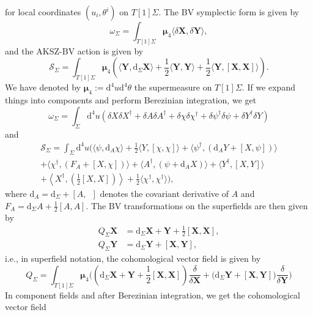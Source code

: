 \documentclass[11pt,colorinlistoftodos]{amsart}
\numberwithin{equation}{subsection}
\theoremstyle{plain}
\theoremstyle{definition}
\theoremstyle{remark}
\newcommand{\dd}{{\mathrm{d}}}
\newcommand{\calS}{\mathcal{S}}
\begin{document}
for local coordinates $(u_i,\theta^i)$ on $T[1]\Sigma$.
The BV symplectic form is given by 
\[
\omega_\Sigma=\int_{T[1]\Sigma}\boldsymbol{\mu}_4\langle \delta \mathbf{X},\delta\mathbf{Y}\rangle,
\]
and the AKSZ-BV action is given by 
\[
\calS_\Sigma=\int_{T[1]\Sigma}\boldsymbol{\mu}_4\left(\langle\mathbf{Y},\dd_\Sigma\mathbf{X}\rangle+\frac{1}{2}\langle\mathbf{Y},\mathbf{Y}\rangle+\frac{1}{2}\langle \mathbf{Y},[\mathbf{X},\mathbf{X}]\rangle\right).
\]
We have denoted by $\boldsymbol{\mu}_4:=\dd^4u\dd^4\theta$ the supermeasure on $T[1]\Sigma$.
If we expand things into components and perform Berezinian integration, we get
\begin{equation}
\omega_\Sigma=\int_\Sigma\dd^4u \left(\delta X \delta X^\dagger+\delta A\delta A^\dagger+\delta\chi\delta\chi^\dagger+\delta\psi^\dagger\delta\psi+\delta Y^\dagger\delta Y\right)
\end{equation}
and
\begin{multline}
\calS_\Sigma= \int_\Sigma\dd^4u\bigg(\langle \psi,\dd_A\chi\rangle+\frac{1}{2}\langle Y,[\chi,\chi]\rangle+\langle \psi^\dagger,(\dd_A Y+[X,\psi])\rangle\\+\langle \chi^\dagger,(F_A+[X,\chi])\rangle+\langle A^\dagger,(\psi+\dd_AX)\rangle+\langle Y^\dagger,[X,Y]\rangle\\+\left\langle X^\dagger,\left(\frac{1}{2}[X,X]\right)\right\rangle+\frac{1}{2}\langle \chi^\dagger,\chi^\dagger\rangle\bigg),
\end{multline}
where $\dd_A=\dd_\Sigma+[A,\enspace]$ denotes the covariant derivative of $A$ and $F_A=\dd_\Sigma A+\frac{1}{2}[A,A]$. The BV transformations on the superfields are then given by 
\begin{align}
    Q_\Sigma \mathbf{X}&=\dd_\Sigma\mathbf{X}+\mathbf{Y}+\frac{1}{2}[\mathbf{X},\mathbf{X}],\\
    Q_\Sigma\mathbf{Y}&=\dd_\Sigma\mathbf{Y}+[\mathbf{X},\mathbf{Y}],
\end{align}
i.e., in superfield notation, the cohomological vector field is given by 
\begin{equation}
    Q_\Sigma=\int_{T[1]\Sigma}\boldsymbol{\mu}_4\Bigg(\left(\dd_{\Sigma}\mathbf{X}+\mathbf{Y}+\frac{1}{2}[\mathbf{X},\mathbf{X}]\right)\frac{\delta}{\delta\mathbf{X}}+\big(\dd_{\Sigma}\mathbf{Y}+[\mathbf{X},\mathbf{Y}]\big)\frac{\delta}{\delta\mathbf{Y}}\Bigg)
\end{equation}
In component fields and after Berezinian integration, we get the cohomological vector field
\end{document}
